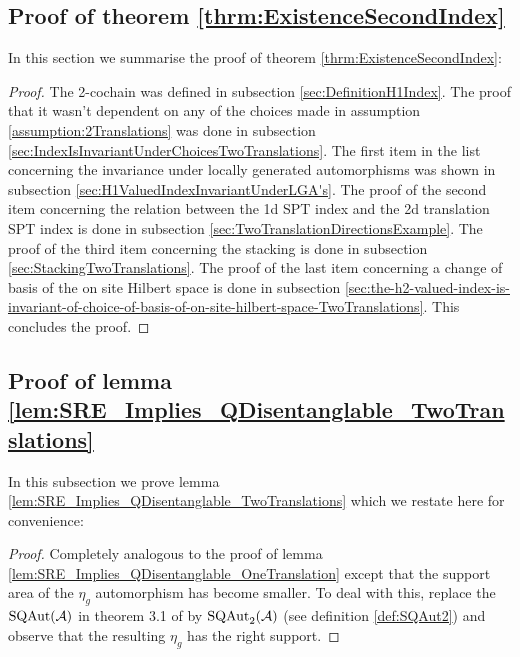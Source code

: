 \documentclass[12pt,a4paper,twoside]{article}
\numberwithin{equation}{section}
\begin{document}
\subsection{Proof of theorem \ref{thrm:ExistenceSecondIndex}}\label{sec:ProofOf:thrm:ExistenceSecondIndex}
In this section we summarise the proof of theorem \ref{thrm:ExistenceSecondIndex}:
\begin{proof}
	The 2-cochain was defined in subsection \ref{sec:DefinitionH1Index}. The proof that it wasn't dependent on any of the choices made in assumption \ref{assumption:2Translations} was done in subsection \ref{sec:IndexIsInvariantUnderChoicesTwoTranslations}. The first item in the list concerning the invariance under locally generated automorphisms was shown in subsection \ref{sec:H1ValuedIndexInvariantUnderLGA's}. The proof of the second item concerning the relation between the 1d SPT index and the 2d translation SPT index is done in subsection \ref{sec:TwoTranslationDirectionsExample}. The proof of the third item concerning the stacking is done in subsection \ref{sec:StackingTwoTranslations}. The proof of the last item concerning a change of basis of the on site Hilbert space is done in subsection \ref{sec:the-h2-valued-index-is-invariant-of-choice-of-basis-of-on-site-hilbert-space-TwoTranslations}. This concludes the proof.
\end{proof}
\subsection{Proof of lemma \ref{lem:SRE_Implies_QDisentanglable_TwoTranslations}}\label{sec:ProofOfMainResult2}
In this subsection we prove lemma \ref{lem:SRE_Implies_QDisentanglable_TwoTranslations} which we restate here for convenience:
\SREImpliesQDisentanglableTwoTranslations*
\begin{proof}
	Completely analogous to the proof of lemma \ref{lem:SRE_Implies_QDisentanglable_OneTranslation} except that the support area of the $\eta_g$ automorphism has become smaller. To deal with this, replace the $\textrm{SQAut}(\AA)$ in theorem 3.1 of \cite{ogata2021h3gmathbb} by $\textrm{SQAut}_2(\AA)$ (see definition \ref{def:SQAut2}) and observe that the resulting $\eta_g$ has the right support.
\end{proof}
\appendix
\end{document}
